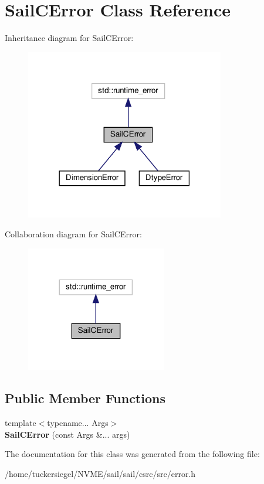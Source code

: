 \hypertarget{classSailCError}{}\section{Sail\+C\+Error Class Reference}
\label{classSailCError}


Inheritance diagram for Sail\+C\+Error\+:\nopagebreak
\begin{figure}[H]
\begin{center}
\leavevmode
\includegraphics[width=246pt]{classSailCError__inherit__graph}
\end{center}
\end{figure}


Collaboration diagram for Sail\+C\+Error\+:\nopagebreak
\begin{figure}[H]
\begin{center}
\leavevmode
\includegraphics[width=173pt]{classSailCError__coll__graph}
\end{center}
\end{figure}
\subsection*{Public Member Functions}
\begin{DoxyCompactItemize}
\item 
\mbox{\label{classSailCError_a25c457ae595ae508ac0e65134a66c6ba}} 
{\footnotesize template$<$typename... Args$>$ }\\{\bfseries Sail\+C\+Error} (const Args \&... args)
\end{DoxyCompactItemize}


The documentation for this class was generated from the following file\+:\begin{DoxyCompactItemize}
\item 
/home/tuckersiegel/\+N\+V\+M\+E/sail/sail/csrc/src/error.\+h\end{DoxyCompactItemize}
